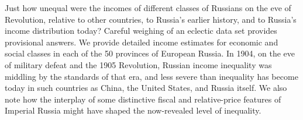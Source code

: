 Just how unequal were the incomes of different classes of Russians on the eve of Revolution, relative to other countries, to Russia’s earlier history, and to Russia’s income distribution today? Careful weighing of an eclectic data set provides provisional answers. We provide detailed income estimates for economic and social classes in each of the 50 provinces of European Russia. In 1904, on the eve of military defeat and the 1905 Revolution, Russian income inequality was middling by the standards of that era, and less severe than inequality has become today in such countries as China, the United States, and Russia itself. We also note how the interplay of some distinctive fiscal and relative-price features of Imperial Russia might have shaped the now-revealed level of inequality.
